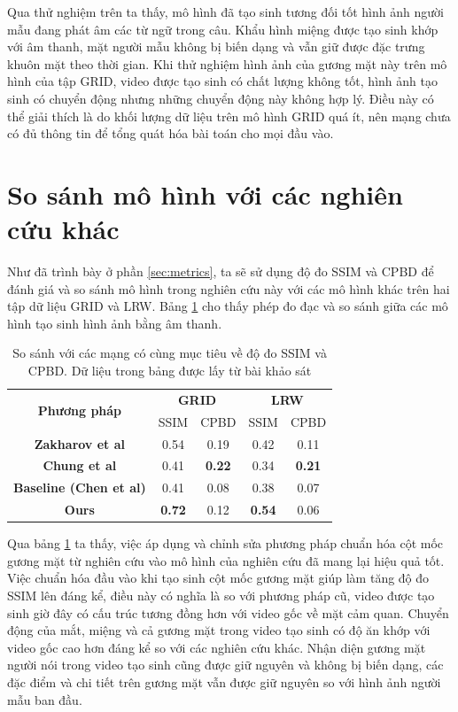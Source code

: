 Qua thử nghiệm trên ta thấy, mô hình đã tạo sinh tương đối tốt hình ảnh người mẫu đang phát âm các từ ngữ trong câu. Khẩu hình miệng được tạo sinh khớp với âm thanh, mặt người mẫu không bị biến dạng và vẫn giữ được đặc trưng khuôn mặt theo thời gian. Khi thử nghiệm hình ảnh của gương mặt này trên mô hình của tập GRID, video được tạo sinh  có chất lượng không tốt, hình ảnh tạo sinh có chuyển động nhưng những chuyển động này không hợp lý. Điều này có thể giải thích là do khối lượng dữ liệu trên mô hình GRID quá ít, nên mạng chưa có đủ thông tin để tổng quát hóa bài toán cho mọi đầu vào.

\section{So sánh mô hình với các nghiên cứu khác}\label{sec:comparision}

Như đã trình bày ở phần \ref{sec:metrics}, ta sẽ sử dụng độ đo SSIM và CPBD để đánh giá và so sánh mô hình trong nghiên cứu này với các mô hình khác trên hai tập dữ liệu GRID và LRW. Bảng \ref{table:metrics_result} cho thấy phép đo đạc và so sánh giữa các mô hình tạo sinh hình ảnh bằng âm thanh.

\begin{table}[h]
    \centering
    \begin{tabular}{c | c | c | c | c}
    \hline 
    \multirow{2}{*}{\textbf{Phương pháp}} & \multicolumn{2}{c|}{\textbf{GRID}} & \multicolumn{2}{c}{\textbf{LRW}}\\
    \cline{2-5}
    & SSIM & CPBD & SSIM & CPBD\\
    \hline
    \textbf{Zakharov et al \cite{zakharov}} & 0.54 & 0.19 & 0.42 & 0.11 \\
    \textbf{Chung et al \cite{chung}} & 0.41 & \textbf{0.22} & 0.34 & \textbf{0.21} \\
    \textbf{Baseline (Chen et al) \cite{chen2019}} & 0.41 & 0.08 & 0.38 & 0.07 \\
    \hline
    \hline
    \textbf{Ours} & \textbf{0.72} & 0.12 & \textbf{0.54} & 0.06 \\
    \hline
    \end{tabular}
    \caption{So sánh với các mạng có cùng mục tiêu về độ đo SSIM và CPBD. Dữ liệu trong bảng được lấy từ bài khảo sát \cite{chen_survey}}
    \label{table:metrics_result}
\end{table}

Qua bảng \ref{table:metrics_result} ta thấy, việc áp dụng và chỉnh sửa phương pháp chuẩn hóa cột mốc gương mặt từ nghiên cứu \cite{gen_face_landmark} vào mô hình của nghiên cứu \cite{chen2019} đã mang lại hiệu quả tốt. Việc chuẩn hóa đầu vào khi tạo sinh cột mốc gương mặt giúp làm tăng độ đo SSIM lên đáng kể, điều này có nghĩa là so với phương pháp cũ, video được tạo sinh giờ đây có cấu trúc tương đồng hơn với video gốc về mặt cảm quan. Chuyển động của mắt, miệng và cả gương mặt trong video tạo sinh có độ ăn khớp với video gốc cao hơn đáng kể so với các nghiên cứu khác. Nhận diện gương mặt người nói trong video tạo sinh cũng được giữ nguyên và không bị biến dạng, các đặc điểm và chi tiết trên gương mặt vẫn được giữ nguyên so với hình ảnh người mẫu ban đầu.

